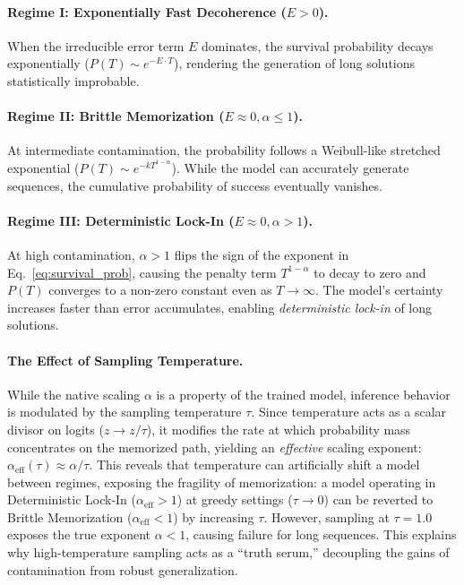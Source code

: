 \paragraph{Regime I: Exponentially Fast Decoherence ($E > 0$).}
When the irreducible error term $E$ dominates, the survival probability decays exponentially ($P(T) \sim e^{-E \cdot T}$), rendering the generation of long solutions statistically improbable.

\paragraph{Regime II: Brittle Memorization ($E \approx 0, \alpha \le 1$).}
At intermediate contamination, the probability follows a Weibull-like stretched exponential ($P(T) \sim e^{-k T^{1-\alpha}}$). While the model can accurately generate sequences, the cumulative probability of success eventually vanishes.

\paragraph{Regime III: Deterministic Lock-In ($E \approx 0, \alpha > 1$).}
At high contamination, $\alpha > 1$ flips the sign of the exponent in Eq.~\ref{eq:survival_prob}, causing the penalty term $T^{1-\alpha}$ to decay to zero and $P(T)$ converges to a non-zero constant even as $T \to \infty$. The model's certainty increases faster than error accumulates, enabling \textit{deterministic lock-in} of long solutions.

\paragraph{The Effect of Sampling Temperature.}
While the native scaling $\alpha$ is a property of the trained model, inference behavior is modulated by the sampling temperature $\tau$.
Since temperature acts as a scalar divisor on logits ($z \to z/\tau$), it modifies the rate at which probability mass concentrates on the memorized path, yielding an \textit{effective} scaling exponent:
$\alpha_{\mathrm{eff}}(\tau) \approx \alpha / \tau$.
This reveals that temperature can artificially shift a model between regimes, exposing the fragility of memorization: a model operating in Deterministic Lock-In ($\alpha_{\mathrm{eff}} > 1$) at greedy settings ($\tau \to 0$) can be reverted to Brittle Memorization ($\alpha_{\mathrm{eff}} < 1$) by increasing $\tau$.
However, sampling at $\tau=1.0$ exposes the true exponent $\alpha < 1$, causing failure for long sequences.
This explains why high-temperature sampling acts as a ``truth serum,'' decoupling the gains of contamination from robust generalization.

